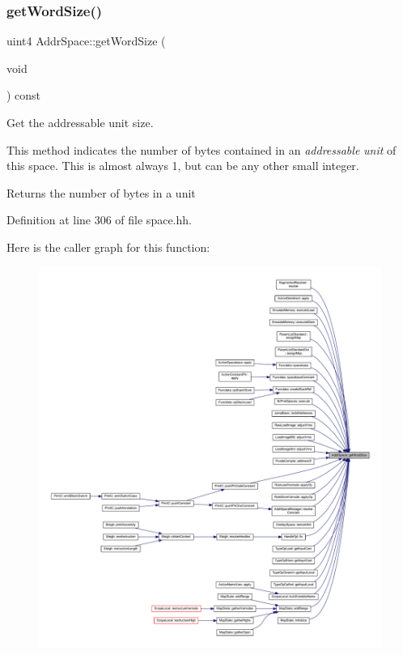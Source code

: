 \subsubsection{\texorpdfstring{getWordSize()}{getWordSize()}}
{\footnotesize\ttfamily uint4 Addr\+Space\+::get\+Word\+Size (\begin{DoxyParamCaption}\item[{void}]{ }\end{DoxyParamCaption}) const\hspace{0.3cm}{\ttfamily [inline]}}



Get the addressable unit size. 

This method indicates the number of bytes contained in an {\itshape addressable} {\itshape unit} of this space. This is almost always 1, but can be any other small integer. \begin{DoxyReturn}{Returns}
the number of bytes in a unit 
\end{DoxyReturn}


Definition at line 306 of file space.\+hh.

Here is the caller graph for this function\+:
\nopagebreak
\begin{figure}[H]
\begin{center}
\leavevmode
\includegraphics[width=350pt]{class_addr_space_ab84baa41a0b25735578129031fef550c_icgraph}
\end{center}
\end{figure}
\mbox{\label{class_addr_space_a1e506360f315658ac46593d12c20a4e0}} 

